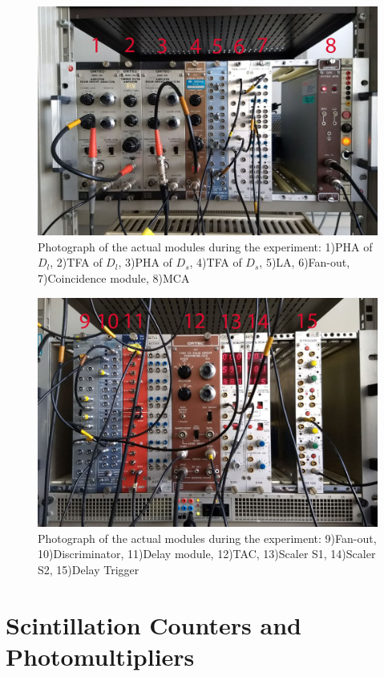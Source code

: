 \documentclass[a4paper,parskip,11pt, DIV12]{scrreprt}
\begin{document}
\begin{figure}[H]
\centering
\includegraphics[scale=0.3]{Rack1-beschriftet.jpg}
\caption[Electronics2]{Photograph of the actual modules during the experiment: 1)PHA of $D_l$, 2)TFA of $D_l$, 3)PHA of $D_s$, 4)TFA of $D_s$, 5)LA, 6)Fan-out, 7)Coincidence module, 8)MCA}
\label{fig:Electronics2}
		\end{figure}
		\begin{figure}[H]
\centering
\includegraphics[scale=0.3]{Rack2-beschriftet.jpg}
\caption[Electronics3]{Photograph of the actual modules during the experiment: 9)Fan-out, 10)Discriminator, 11)Delay module, 12)TAC, 13)Scaler S1, 14)Scaler S2, 15)Delay Trigger}
\label{fig:Electronics3}
		\end{figure}

\section{Scintillation Counters and Photomultipliers}
\end{document}
